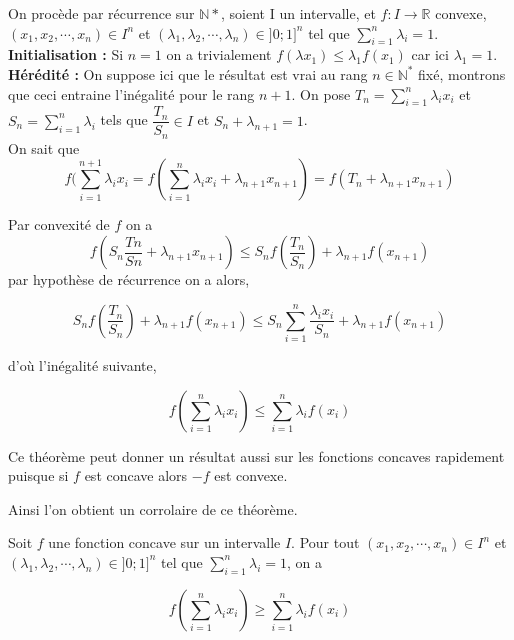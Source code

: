 \documentclass[french]{book}
\newcommand{\se}{\geq}
\newcommand{\ie}{\leq}
\begin{document}
\begin{demo}
On procède par récurrence sur $\mathbb{N}*$, soient I un intervalle, et $f : I \longrightarrow \mathbb{R}$ 
convexe, $(x_1,x_2, \cdots , x_n) \in I^n $ et $(\lambda_1,\lambda_2, \cdots , \lambda_n) \in ]0;1]^n $ tel que $\sum_{i=1}^n \lambda_i =1$.\\

\textbf{Initialisation :} Si $n=1$ on a trivialement $f(\lambda x_1)\ie \lambda_1f(x_1)$ car ici $\lambda_1=1$.\\

\textbf{Hérédité : }On suppose ici que le résultat est vrai au rang $n \in \mathbb{N}^*$ fixé, montrons que ceci entraine l’inégalité pour le rang $n + 1$. On pose $T_n = \sum_{i=1}^n \lambda_i x_i $ et $S_n=\sum_{i=1}^n \lambda_i$  tels que $\dfrac{T_n}{S_n} \in I$ et $S_n + \lambda_{n+1} =1$.\\

On sait que 
$$f(\sum_{i=1}^{n+1} \lambda_i x_i =f( \sum_{i=1}^{n} \lambda_i x_i + \lambda_{n+1} x_{n+1} ) = f(T_n+ \lambda_{n+1} x_{n+1} )$$

Par convexité de $f$ on  a
$$f(S_n\dfrac{Tn}{Sn} + \lambda_{n+1} x_{n+1} ) \ie S_n f( \dfrac{T_n}{S_n}) + \lambda_{n+1} f(x_{n+1})$$ 
par hypothèse de récurrence on a alors,

$$ S_n f( \dfrac{T_n}{S_n}) + \lambda_{n+1} f(x_{n+1}) \ie S_n \sum_{i=1}^n \dfrac{\lambda_i x_i}{S_n} +  \lambda_{n+1} f(x_{n+1})$$

d'où l'inégalité suivante, 

$$f(\sum_{i=1}^{n} \lambda_i x_i) \ie \sum_{i=1}^n \lambda_i f(x_i)$$

\end{demo}

Ce théorème peut donner un résultat aussi sur les fonctions concaves rapidement puisque si $f$ est concave alors $-f$ est convexe. 

Ainsi l'on obtient un corrolaire de ce théorème.

\begin{cor}
Soit $f$ une fonction concave sur un intervalle $I$. Pour tout $(x_1,x_2, \cdots , x_n) \in I^n $ et $(\lambda_1,\lambda_2, \cdots , \lambda_n) \in ]0;1]^n $ tel que $\sum_{i=1}^n \lambda_i =1$, on a

$$f(\sum_{i=1}^{n} \lambda_i x_i) \se \sum_{i=1}^n \lambda_i f(x_i)$$
\end{cor}

\newpage
\end{document}
